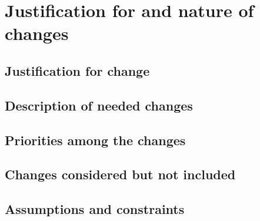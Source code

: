 
\chapter{Justification for and nature of changes}
\label{loc:Justification for and nature of changes}


\section{Justification for change}
\label{loc:Justification for change}


\section{Description of needed changes}
\label{loc:Description of needed changes}


\section{Priorities among the changes}
\label{loc:Priorities among the changes}


\section{Changes considered but not included}
\label{loc:Changes considered but not included}


\section{Assumptions and constraints}
\label{loc:Assumptions and constraints}
